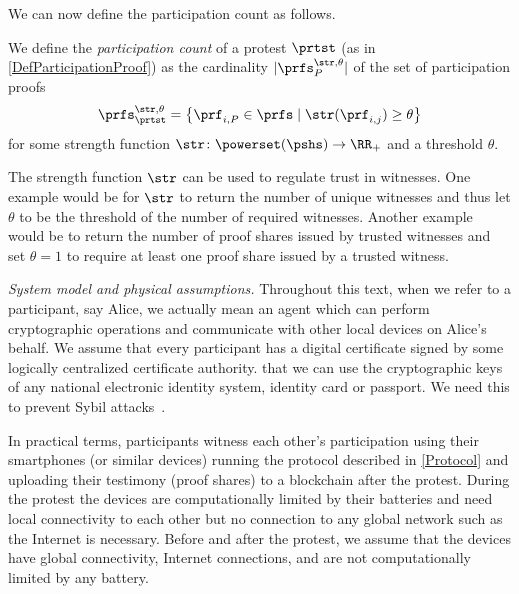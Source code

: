 \NewFunction{\str}{\varsigma}

We can now define the participation count as follows.
\begin{definition}
  We define the \emph{participation count} of a protest \(\prtst\) (as in 
  \cref{DefParticipationProof}) as the cardinality \(|\prfs_{P}^{\str,\theta}|\) 
  of the set of participation proofs \[
    \prfs_{\prtst}^{\str,\theta} = \left\{ \prf_{i,P} \in \prfs \mid
      \str(\prf_{i,j})\geq \theta \right\}
  \] for some strength function \(\str\colon \powerset(\pshs)\to \RR_+\) and a 
  threshold \(\theta\).
\end{definition}
The strength function \(\str\) can be used to regulate trust in witnesses.
One example would be for \(\str\) to return the number of unique witnesses and 
thus let \(\theta\) to be the threshold of the number of required witnesses.
Another example would be to return the number of proof shares issued by trusted 
witnesses and set \(\theta = 1\) to require at least one proof share issued by a 
trusted witness.

\emph{System model and physical assumptions.}\label{assumptions}
Throughout this text, when we refer to a participant, say Alice, we actually 
mean an agent which can perform cryptographic operations and communicate with 
other local devices on Alice's behalf. We assume that every participant has a digital certificate signed by 
some logically centralized certificate authority.
\Eg that we can use the cryptographic keys of any national electronic identity 
system, identity card or passport.
We need this to prevent Sybil attacks~\cite{SybilAttack}.

In practical terms, participants witness each other's participation
using their smartphones (or similar devices) running the protocol described in
\cref{Protocol} and uploading their testimony (\ie proof shares) to a blockchain 
after the protest. During the protest the devices are computationally limited by 
their batteries and need local connectivity to each other but no connection to
any global network such as the Internet is necessary. Before and
after the protest, we assume that the devices have global connectivity, \ie 
Internet  connections, and are not computationally limited by any battery.









